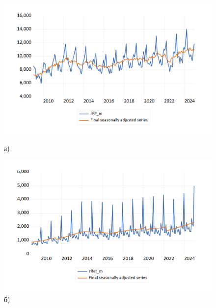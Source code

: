 \documentclass[a4paper, 14pt]{extreport}
\numberwithin{equation}{section}
\numberwithin{equation}{section}
\begin{document}
	\begin{figure}[h!]
	\centering
	\begin{minipage}{0.5\textwidth}
		\centering
		\includegraphics[scale=0.4]{images/image17}
		\caption*{а)}
	\end{minipage}%
	\begin{minipage}{0.5\textwidth}
		\centering
		\includegraphics[scale=0.4]{images/image16}
		\caption*{б)}
	\end{minipage}%
	

\end{figure}
\end{document}
